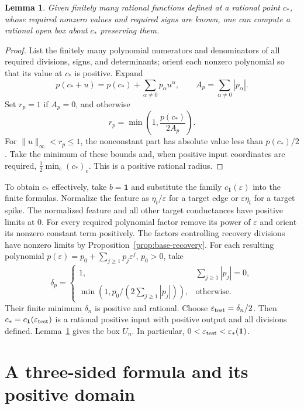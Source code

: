 \documentclass[11pt]{article}
\newtheorem{lemma}[theorem]{Lemma}
\theoremstyle{definition}
\newcommand{\one}{\mathbf 1}
\begin{document}
\begin{lemma}
\label{lem:polynomial-box}
Given finitely many rational functions defined at a rational point
\(c_*\), whose required nonzero values and required signs are known,
one can compute a rational open box about \(c_*\) preserving them.
\end{lemma}
\begin{proof}
List the finitely many polynomial numerators and denominators of all
required divisions, signs, and determinants; orient each nonzero
polynomial so that its value at \(c_*\) is positive.
Expand
\[
 p(c_*+u)=p(c_*)+\sum_{\alpha\ne0}p_\alpha u^\alpha,\qquad
 A_p=\sum_{\alpha\ne0}|p_\alpha|.
\]
Set \(r_p=1\) if \(A_p=0\), and otherwise
\[
 r_p=\min\left(1,\frac{p(c_*)}{2A_p}\right).
\]
For \(\|u\|_\infty<r_p\le1\), the nonconstant part has absolute value
less than \(p(c_*)/2\). Take the minimum of these bounds and, when
positive input coordinates are required,
\(\frac12\min_e(c_*)_e\).
This is a positive rational radius.
\end{proof}

To obtain \(c_*\) effectively, take \(b=\one\) and substitute the
family \(c_{\one}(\varepsilon)\)
into the finite formulas. Normalize the feature as
\(\eta_t/\varepsilon\) for a target edge or
\(\varepsilon\eta_t\) for a target spike.
The normalized feature and all other target conductances have positive
limits at 0. For every required polynomial factor remove its power of
\(\varepsilon\) and orient its nonzero constant term positively.
The factors controlling recovery divisions have nonzero limits by
Proposition~\ref{prop:base-recovery}.
For each resulting polynomial
\(p(\varepsilon)=p_0+\sum_{j\ge1}p_j\varepsilon^j\), \(p_0>0\), take
\[
 \delta_p=
 \begin{cases}
 1,&\sum_{j\ge1}|p_j|=0,\\
 \min(1,p_0/(2\sum_{j\ge1}|p_j|)),&\text{otherwise}.
 \end{cases}
\]
Their finite minimum \(\delta_n\) is positive and rational.
Choose \(\varepsilon_{\rm test}=\delta_n/2\).
Then \(c_*=c_{\one}(\varepsilon_{\rm test})\) is a rational positive input with positive
output and all divisions defined.
Lemma~\ref{lem:polynomial-box} gives the box \(U_n\).
In particular, $0<\varepsilon_{\rm test}<\varepsilon_*(\one)$.

\section{A three-sided formula and its positive domain}
\label{sec:three-example}
\end{document}

